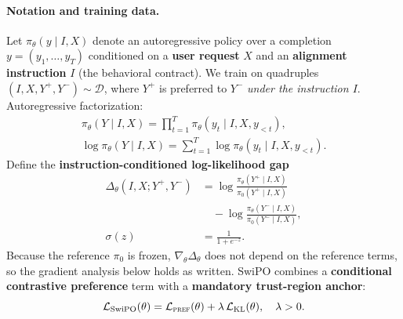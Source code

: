 \paragraph{Notation and training data.}
Let $\pi_\theta(y\mid I,X)$ denote an autoregressive policy over a completion
$y=(y_1,\ldots,y_T)$ conditioned on a \textbf{user request} $X$ and an \textbf{alignment instruction} $I$
(the behavioral contract). We train on quadruples $(I,X,Y^+,Y^-)\sim\mathcal{D}$, where $Y^+$ is preferred to $Y^-$ \emph{under the instruction $I$}.
Autoregressive factorization:
\begin{gather*}
\pi_\theta(Y\mid I,X)
=
\prod_{t=1}^{T}\pi_\theta(y_t\mid I,X,y_{<t}),\\
\log \pi_\theta(Y\mid I,X)
=
\sum_{t=1}^{T}\log \pi_\theta(y_t\mid I,X,y_{<t}).
\end{gather*}
Define the \textbf{instruction-conditioned log-likelihood gap}
{\footnotesize
\begin{align*}
\Delta_\theta(I,X;Y^+,Y^-)
&=
\log \tfrac{\pi_\theta(Y^+\mid I,X)}{\pi_0(Y^+\mid I,X)}\\
&\quad -\log \tfrac{\pi_\theta(Y^-\mid I,X)}{\pi_0(Y^-\mid I,X)},\\
\sigma(z)&=\tfrac{1}{1+e^{-z}}.
\end{align*}
}
Because the reference $\pi_0$ is frozen, $\nabla_\theta\Delta_\theta$ does not depend on the reference terms, so the gradient analysis below holds as written.
SwiPO combines a \textbf{conditional contrastive preference} term with a \textbf{mandatory trust-region anchor}:
\[
\mathcal{L}_{\mathrm{SwiPO}}(\theta)
=
\mathcal{L}_{\textsc{pref}}(\theta)
+
\lambda\,\mathcal{L}_{\textsc{KL}}(\theta),
\quad
\lambda>0.
\]

\vspace{-0.35em}
